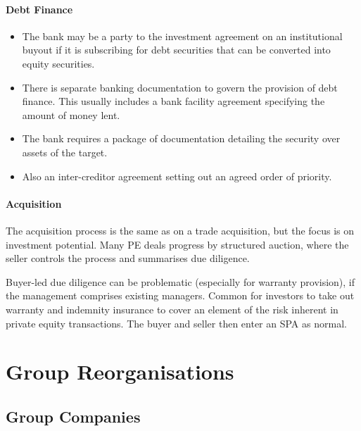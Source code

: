 \documentclass[
]{article}
\providecommand{\tightlist}{%
  \setlength{\itemsep}{0pt}\setlength{\parskip}{0pt}}
\begin{document}
\hypertarget{debt-finance}{%
\paragraph{Debt Finance}\label{debt-finance}}

\begin{itemize}
\tightlist
\item
  The bank may be a party to the investment agreement on an
  institutional buyout if it is subscribing for debt securities that can
  be converted into equity securities.
\item
  There is separate banking documentation to govern the provision of
  debt finance. This usually includes a bank facility agreement
  specifying the amount of money lent.
\item
  The bank requires a package of documentation detailing the security
  over assets of the target.
\item
  Also an inter-creditor agreement setting out an agreed order of
  priority.
\end{itemize}

\hypertarget{acquisition}{%
\paragraph{Acquisition}\label{acquisition}}

The acquisition process is the same as on a trade acquisition, but the
focus is on investment potential. Many PE deals progress by structured
auction, where the seller controls the process and summarises due
diligence.

Buyer-led due diligence can be problematic (especially for warranty
provision), if the management comprises existing managers. Common for
investors to take out warranty and indemnity insurance to cover an
element of the risk inherent in private equity transactions. The buyer
and seller then enter an SPA as normal.

\hypertarget{group-reorganisations}{%
\section{Group Reorganisations}\label{group-reorganisations}}

\hypertarget{group-companies}{%
\subsection{Group Companies}\label{group-companies}}
\end{document}
